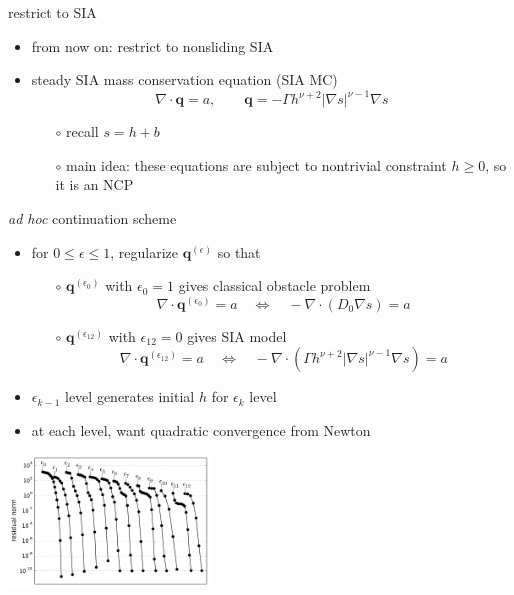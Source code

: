 \documentclass[xcolor={dvipsnames}]{beamer}
\newcommand\bq{\mathbf{q}}
\newcommand\Div{\nabla\cdot}
\newcommand\eps{\epsilon}
\newcommand\grad{\nabla}
\begin{document}
\begin{frame}{restrict to SIA}

\begin{itemize}
\item from now on: restrict to nonsliding SIA
\item steady SIA mass conservation equation (SIA MC)
    $$\Div \bq = a, \qquad \bq = - \Gamma h^{\nu+2} |\grad s|^{\nu-1} \grad s$$

\vspace{-2mm}
    \begin{itemize}
    \item[$\circ$] recall $s=h+b$
    \item[$\circ$] main idea: these equations are subject to nontrivial constraint $h\ge 0$, so it is an NCP
    \end{itemize}
\end{itemize}
\end{frame}


\begin{frame}{\emph{ad hoc} continuation scheme}

\begin{itemize}
\item for $0 \le \eps \le 1$, regularize $\bq^{(\eps)}$ so that
  \begin{itemize}
  \item[$\circ$] $\bq^{(\eps_0)}$ with $\eps_0=1$ gives classical obstacle problem
    $$\Div \bq^{(\eps_0)} = a \quad \iff \quad - \Div (D_0 \grad s) = a$$
  \item[$\circ$] $\bq^{(\eps_{12})}$ with $\eps_{12}=0$ gives SIA model
    $$\Div \bq^{(\eps_{12})} = a \quad \iff \quad - \Div (\Gamma h^{\nu+2} |\grad s|^{\nu-1} \grad s) = a$$
  \end{itemize}
\item $\eps_{k-1}$ level generates initial $h$ for $\eps_k$ level
\item at each level, want quadratic convergence from Newton
\end{itemize}

\begin{center}
\includegraphics[width=0.4\textwidth,keepaspectratio=true]{newtonconv}
\end{center}
\end{frame}
\end{document}
